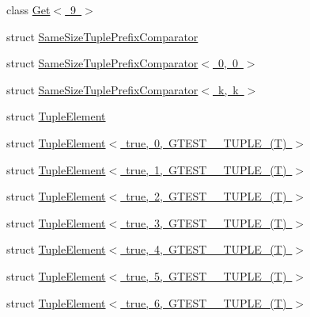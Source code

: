 \begin{DoxyCompactItemize}
class \mbox{\hyperlink{classstd_1_1tr1_1_1gtest__internal_1_1_get_3_019_01_4}{Get$<$ 9 $>$}}
\item 
struct \mbox{\hyperlink{structstd_1_1tr1_1_1gtest__internal_1_1_same_size_tuple_prefix_comparator}{Same\+Size\+Tuple\+Prefix\+Comparator}}
\item 
struct \mbox{\hyperlink{structstd_1_1tr1_1_1gtest__internal_1_1_same_size_tuple_prefix_comparator_3_010_00_010_01_4}{Same\+Size\+Tuple\+Prefix\+Comparator$<$ 0, 0 $>$}}
\item 
struct \mbox{\hyperlink{structstd_1_1tr1_1_1gtest__internal_1_1_same_size_tuple_prefix_comparator_3_01k_00_01k_01_4}{Same\+Size\+Tuple\+Prefix\+Comparator$<$ k, k $>$}}
\item 
struct \mbox{\hyperlink{structstd_1_1tr1_1_1gtest__internal_1_1_tuple_element}{Tuple\+Element}}
\item 
struct \mbox{\hyperlink{structstd_1_1tr1_1_1gtest__internal_1_1_tuple_element_3_01true_00_010_00_01_g_t_e_s_t__10___t_u_p_l_e___07_t_08_01_4}{Tuple\+Element$<$ true, 0, G\+T\+E\+S\+T\+\_\+\_\+\+T\+U\+P\+L\+E\+\_\+(\+T) $>$}}
\item 
struct \mbox{\hyperlink{structstd_1_1tr1_1_1gtest__internal_1_1_tuple_element_3_01true_00_011_00_01_g_t_e_s_t__10___t_u_p_l_e___07_t_08_01_4}{Tuple\+Element$<$ true, 1, G\+T\+E\+S\+T\+\_\+\_\+\+T\+U\+P\+L\+E\+\_\+(\+T) $>$}}
\item 
struct \mbox{\hyperlink{structstd_1_1tr1_1_1gtest__internal_1_1_tuple_element_3_01true_00_012_00_01_g_t_e_s_t__10___t_u_p_l_e___07_t_08_01_4}{Tuple\+Element$<$ true, 2, G\+T\+E\+S\+T\+\_\+\_\+\+T\+U\+P\+L\+E\+\_\+(\+T) $>$}}
\item 
struct \mbox{\hyperlink{structstd_1_1tr1_1_1gtest__internal_1_1_tuple_element_3_01true_00_013_00_01_g_t_e_s_t__10___t_u_p_l_e___07_t_08_01_4}{Tuple\+Element$<$ true, 3, G\+T\+E\+S\+T\+\_\+\_\+\+T\+U\+P\+L\+E\+\_\+(\+T) $>$}}
\item 
struct \mbox{\hyperlink{structstd_1_1tr1_1_1gtest__internal_1_1_tuple_element_3_01true_00_014_00_01_g_t_e_s_t__10___t_u_p_l_e___07_t_08_01_4}{Tuple\+Element$<$ true, 4, G\+T\+E\+S\+T\+\_\+\_\+\+T\+U\+P\+L\+E\+\_\+(\+T) $>$}}
\item 
struct \mbox{\hyperlink{structstd_1_1tr1_1_1gtest__internal_1_1_tuple_element_3_01true_00_015_00_01_g_t_e_s_t__10___t_u_p_l_e___07_t_08_01_4}{Tuple\+Element$<$ true, 5, G\+T\+E\+S\+T\+\_\+\_\+\+T\+U\+P\+L\+E\+\_\+(\+T) $>$}}
\item 
struct \mbox{\hyperlink{structstd_1_1tr1_1_1gtest__internal_1_1_tuple_element_3_01true_00_016_00_01_g_t_e_s_t__10___t_u_p_l_e___07_t_08_01_4}{Tuple\+Element$<$ true, 6, G\+T\+E\+S\+T\+\_\+\_\+\+T\+U\+P\+L\+E\+\_\+(\+T) $>$}}

\end{DoxyCompactItemize}
